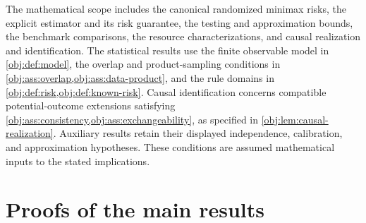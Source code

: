 \documentclass[11pt]{article}
\begin{document}
The mathematical scope includes the canonical randomized minimax risks, the explicit estimator and its risk guarantee, the testing and approximation bounds, the benchmark comparisons, the resource characterizations, and causal realization and identification. The statistical results use the finite observable model in \cref{obj:def:model}, the overlap and product-sampling conditions in \cref{obj:ass:overlap,obj:ass:data-product}, and the rule domains in \cref{obj:def:risk,obj:def:known-risk}. Causal identification concerns compatible potential-outcome extensions satisfying \cref{obj:ass:consistency,obj:ass:exchangeability}, as specified in \cref{obj:lem:causal-realization}. Auxiliary results retain their displayed independence, calibration, and approximation hypotheses. These conditions are assumed mathematical inputs to the stated implications.


\section{Proofs of the main results}\label{sec:deferred-proofs}
\end{document}
